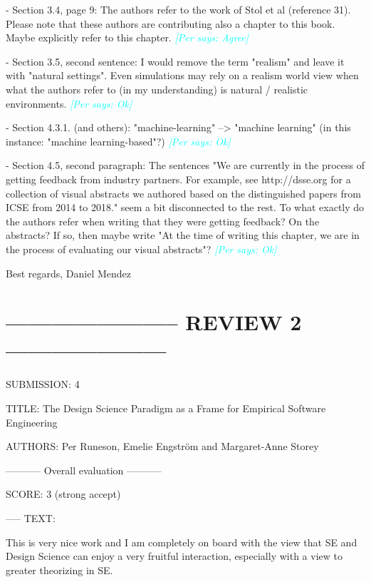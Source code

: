 \documentclass{article}
\newcommand{\per}[1]{\textcolor{cyan}{{\it [Per says: #1]}}}
\newcommand{\per}[1]{}
\begin{document}
- Section 3.4, page 9: The authors refer to the work of Stol et al (reference 31). Please note that these authors are contributing also a chapter to this book. Maybe explicitly refer to this chapter. \per{Agree}

- Section 3.5, second sentence: I would remove the term "realism" and leave it with "natural settings". Even simulations may rely on a realism world view when what the authors refer to (in my understanding) is natural / realistic environments. \per{Ok}

- Section 4.3.1. (and others): "machine-learning" --> "machine learning" (in this instance: "machine learning-based"?) \per{Ok}

- Section 4.5, second paragraph: The sentences "We are currently in the process of getting feedback from industry partners. For example, see http://dsse.org for a collection of visual abstracts we authored based on the distinguished papers from ICSE from 2014 to 2018." seem a bit disconnected to the rest. To what exactly do the authors refer when writing that they were getting feedback? On the abstracts? If so, then maybe write "At the time of writing this chapter, we are in the process of evaluating our visual abstracts"? \per{Ok}

Best regards, 
Daniel Mendez



\section*{----------------------- REVIEW 2 ---------------------}
SUBMISSION: 4

TITLE: The Design Science Paradigm as a Frame for Empirical Software Engineering

AUTHORS: Per Runeson, Emelie Engström and Margaret-Anne Storey

----------- Overall evaluation -----------

SCORE: 3 (strong accept)

----- TEXT:

This is very nice work and I am completely on board with the view that SE and Design Science can enjoy a very fruitful interaction, especially with a view to greater theorizing in SE.
\end{document}
